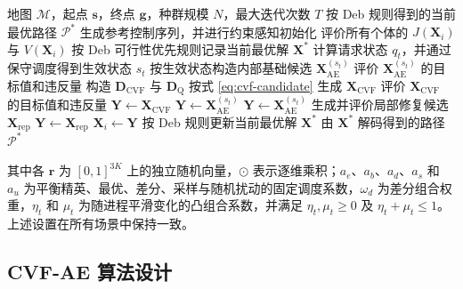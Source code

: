 \begin{algorithm}[H]
\caption{CVF-AE 路径搜索流程}
\label{alg:cvf-ae}
\scriptsize
\begin{algorithmic}[1]
\Require 地图 $\mathcal{M}$，起点 $\mathbf{s}$，终点 $\mathbf{g}$，种群规模 $N$，最大迭代次数 $T$
    \Ensure 按 Deb 规则得到的当前最优路径 $\mathcal{P}^*$
\State 生成参考控制序列，并进行约束感知初始化
\State 评价所有个体的 $J(\mathbf{X}_i)$ 与 $V(\mathbf{X}_i)$
\State 按 Deb 可行性优先规则记录当前最优解 $\mathbf{X}^*$
    \State 计算请求状态 $q_t$，并通过保守调度得到生效状态 $s_t$
        \State 按生效状态构造内部基础候选 $\mathbf{X}_{\mathrm{AE}}^{(s_t)}$
        \State 评价 $\mathbf{X}_{\mathrm{AE}}^{(s_t)}$ 的目标值和违反量
            \State 构造 $\mathbf{D}_{\mathrm{CVF}}$ 与 $\mathbf{D}_{\mathrm{Q}}$
            \State 按式 \eqref{eq:cvf-candidate} 生成 $\mathbf{X}_{\mathrm{CVF}}$
            \State 评价 $\mathbf{X}_{\mathrm{CVF}}$ 的目标值和违反量
                \State $\mathbf{Y}\gets \mathbf{X}_{\mathrm{CVF}}$
            \Else
                \State $\mathbf{Y}\gets \mathbf{X}_{\mathrm{AE}}^{(s_t)}$
            \EndIf
        \Else
            \State $\mathbf{Y}\gets \mathbf{X}_{\mathrm{AE}}^{(s_t)}$
        \EndIf
            \State 生成并评价局部修复候选 $\mathbf{X}_{\mathrm{rep}}$
                \State $\mathbf{Y}\gets\mathbf{X}_{\mathrm{rep}}$
            \EndIf
        \EndIf
            \State $\mathbf{X}_i\gets \mathbf{Y}$
        \EndIf
    \EndFor
    \State 按 Deb 规则更新当前最优解 $\mathbf{X}^*$
\EndFor
\State \Return 由 $\mathbf{X}^*$ 解码得到的路径 $\mathcal{P}^*$
\end{algorithmic}
\end{algorithm}


其中各 $\mathbf r$ 为 $[0,1]^{3K}$ 上的独立随机向量，$\odot$ 表示逐维乘积；$a_e$、$a_b$、$a_d$、$a_s$ 和 $a_u$ 为平衡精英、最优、差分、采样与随机扰动的固定调度系数，$\omega_d$ 为差分组合权重，$\eta_t$ 和 $\mu_t$ 为随进程平滑变化的凸组合系数，并满足 $\eta_t,\mu_t\geq0$ 及 $\eta_t+\mu_t\leq1$。上述设置在所有场景中保持一致。

\subsection{CVF-AE 算法设计}

